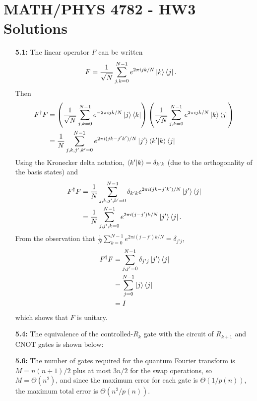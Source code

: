 \documentclass[a4paper,12pt]{article}
\begin{document}
	
\section*{MATH/PHYS 4782 - HW3 Solutions}

\begin{enumerate}
    \item[\textbf{5.1:}]
        The linear operator $F$ can be written
        \begin{align*}
            F &= \frac{1}{\sqrt{N}} \sum_{j, k = 0}^{N - 1} e^{2 \pi ijk / N} \ket{k} \bra{j}.
        \end{align*}
        Then
        \begin{align*}
            F^\dagger F &= \left( \frac{1}{\sqrt{N}} \sum_{j, k = 0}^{N - 1} e^{-2 \pi ijk / N} \ket{j} \bra{k} \right) \left( \frac{1}{\sqrt{N}} \sum_{j, k = 0}^{N - 1} e^{2 \pi ijk / N} \ket{k} \bra{j} \right) \\
            &= \frac{1}{N} \sum_{j, k, j', k' = 0}^{N - 1} e^{2 \pi i(jk - j'k') / N} \ket{j'} \braket{k'}{k} \bra{j}
        \end{align*}
        Using the Kronecker delta notation, $\braket{k'}{k} = \delta_{k'k}$ (due to the orthogonality of the basis states) and
        \begin{align*}
            F^\dagger F &= \frac{1}{N} \sum_{j, k, j', k' = 0}^{N - 1} \delta_{k'k} e^{2 \pi i(jk - j'k') / N} \ket{j'} \bra{j} \\
            &= \frac{1}{N} \sum_{j, j', k = 0}^{N - 1} e^{2 \pi i(j - j')k / N} \ket{j'} \bra{j}.
        \end{align*}
        From the observation that $\frac{1}{N} \sum_{k = 0}^{N - 1} e^{2 \pi i(j - j')k / N} = \delta_{j'j}$,
        \begin{align*}
            F^\dagger F &= \sum_{j, j' = 0}^{N - 1} \delta_{j'j} \ket{j'} \bra{j} \\
            &= \sum_{j = 0}^{N - 1} \ket{j} \bra{j} \\
            &= I
        \end{align*}
        which shows that $F$ is unitary.

    \item[\textbf{5.4:}]
        The equivalence of the controlled-$R_k$ gate with the circuit of $R_{k + 1}$ and CNOT gates is shown below: \\[1.5in]

    \item[\textbf{5.6:}]
        The number of gates required for the quantum Fourier transform is $M = n(n + 1) / 2$ plus at most $3n / 2$ for the swap operations, so $M = \Theta(n^2)$, and since the maximum error for each gate is $\Theta(1 / p(n))$, the maximum total error is $\Theta(n^2 / p(n))$.


\end{enumerate}
\end{document}
